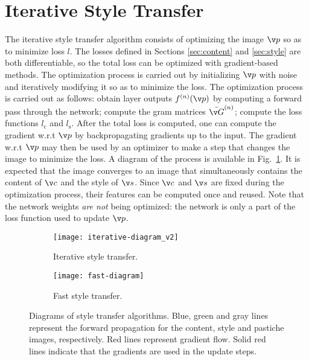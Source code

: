 \section{Iterative Style Transfer}
The iterative style transfer algorithm consists of optimizing the image $\v p$ so as to minimize loss $l$. The losses defined in Sections \ref{sec:content} and \ref{sec:style} are both differentiable, so the total loss can be optimized with gradient-based methods. The optimization process is carried out by initializing $\v p$ with noise and iteratively modifying it so as to minimize the loss. The optimization process is carried out as follows: obtain layer outputs $f^{(n)}(\v p)$ by computing a forward pass through the network; compute the gram matrices $\bar{\v G}^{(n)}$; compute the loss functions $l_\text{c}$ and $l_\text{s}$. After the total loss is computed, one can compute the gradient w.r.t $\v p$ by backpropagating gradients up to the input. The gradient w.r.t $\v p$ may then be used by an optimizer to make a step that changes the image to minimize the loss. A diagram of the process is available in Fig.~\ref{fig:iterative-diagram}. It is expected that the image converges to an image that simultaneously contains the content of $\v c$ and the style of $\v s$. Since $\v c$ and $\v s$ are fixed during the optimization process, their features can be computed once and reused. Note that the network weights \textit{are not} being optimized: the network is only a part of the loss function used to update $\v p$.

\begin{figure}[b]
	\centering
	\begin{subfigure}{\textwidth}
	\texttt{[image: iterative-diagram\_v2]}
	\caption{Iterative style transfer.\label{fig:iterative-diagram}}
	\end{subfigure}
	
	\begin{subfigure}{\textwidth}
		\centering
		\texttt{[image: fast-diagram]}
		\caption{Fast style transfer.\label{fig:fast-diagram}}
	\end{subfigure}
	\caption[Diagrams of style transfer algorithms.]{Diagrams of style transfer algorithms. Blue, green and gray lines represent the forward propagation for the content, style and pastiche images, respectively. Red lines represent gradient flow. Solid red lines indicate that the gradients are used in the update steps.}
\end{figure}

